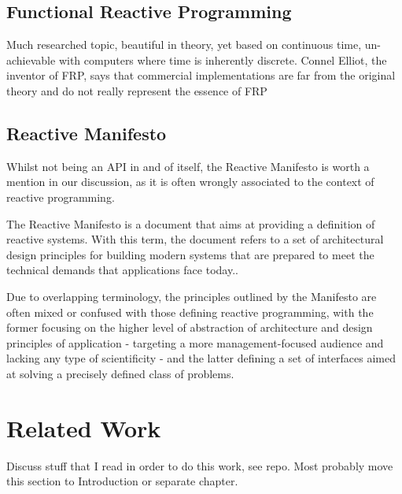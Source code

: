 \subsection{Functional Reactive Programming}
\label{frp}
Much researched topic, beautiful in theory, yet based on continuous time, un-achievable with computers where time is inherently discrete. Connel Elliot, the inventor of FRP, says that commercial implementations are far from the original theory and do not really represent the essence of FRP

\subsection{Reactive Manifesto}

Whilst not being an API in and of itself, the Reactive Manifesto is worth a mention in our discussion, as it is often wrongly associated to the context of reactive programming.

The Reactive Manifesto\cite{reactive-manifesto} is a document that aims at providing a definition of reactive systems. With this term, the document refers to a set of architectural design principles for building modern systems that are prepared to meet the technical demands that applications face today.\cite{manifesto-vs-programming}. 

Due to overlapping terminology, the principles outlined by the Manifesto are often mixed or confused with those defining reactive programming, with the former focusing on the higher level of abstraction of architecture and design principles of application - targeting a more management-focused audience and lacking any type of scientificity - and the latter defining a set of interfaces aimed at solving a precisely defined class of problems.

\section{Related Work}
Discuss stuff that I read in order to do this work, see repo. Most probably move this section to Introduction or separate chapter.
